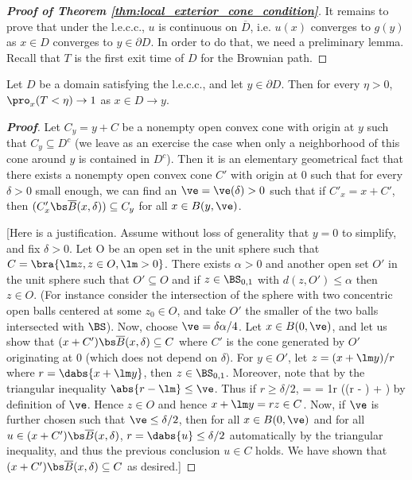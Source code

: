 \begin{proof}[\bf Proof of Theorem \ref{thm:local_exterior_cone_condition}]
It remains to prove that under the l.e.c.c., $u$ is continuous on $\overline{D}$, i.e. $u(x)$ converges to $g(y)$ as $x \in D$ converges to $y \in \partial D$. In order to do that, we need a preliminary lemma. Recall that $T$ is the first exit time of $D$ for the Brownian path.
\end{proof}

\begin{lemma}
Let $D$ be a domain satisfying the l.e.c.c., and let $y \in \partial D$. Then for every $\eta > 0$, $\pro_x(T < \eta) \to 1$ as $x \in D \to y$.
\end{lemma}
\begin{proof}[\bf Proof]
Let $C_y = y +C$ be a nonempty open convex cone with origin at $y$ such that $C_y \subseteq  D^c$ (we leave as an exercise the case when only a neighborhood of this cone around $y$ is contained in $D^c$). Then it is an elementary geometrical fact that there exists a nonempty open convex cone $C'$ with origin at 0 such that for every $\delta > 0$ small enough, we can find an $\ve = \ve(\delta) > 0$ such that if $C'_x = x + C'$, then $(C'_x \bs \overline{B}(x, \delta)) \subseteq  C_y$ for all $x \in B(y, \ve)$.

[Here is a justification. Assume without loss of generality that $y = 0$ to simplify, and fix $\delta > 0$. Let O be an open set in the unit sphere such that $C = \bra{\lm z, z \in O, \lm > 0}$. There exists $\alpha > 0$ and another open set $O'$ in the unit sphere such that $O' \subseteq O$ and if $z \in \BS_{0,1}$ with $d(z,O') \leq \alpha$ then $z \in O$. (For instance consider the intersection of the sphere with two concentric open balls centered at some $z_0 \in O$, and take $O'$ the smaller of the two balls intersected with $\BS$). Now, choose $\ve = \delta \alpha /4$. Let $x \in B(0,\ve)$, and let us show that $(x+C') \bs \overline{B}(x, \delta ) \subseteq C$ where $C'$ is the cone generated by $O'$ originating at 0 (which does not depend on $\delta$). For $y \in O'$, let $z = (x + \lm y)/r$ where $r = \dabs{x + \lm y}$, then $z \in \BS_{0,1}$. Moreover, note that by the triangular inequality $\abs{r - \lm} \leq \ve$. Thus if $r \geq \delta/2$,
\be
{} =  = \frac 1r \leq {}((r - \geq) + \ve) \leq \frac {4\ve}{\delta} \leq \alpha
\ee
by definition of $\ve$. Hence $z \in O$ and hence $x + \lm y = rz \in C$. Now, if $\ve$ is further chosen such that $\ve \leq \delta/2$, then for all $x \in B(0,\ve)$ and for all $u \in (x + C') \bs \overline{B}(x, \delta)$, $r = \dabs{u} \leq \delta/2$ automatically by the triangular inequality, and thus the previous conclusion $u \in C$ holds. We have shown that $(x + C') \bs \overline{B}(x, \delta) \subseteq C$ as desired.]


\end{proof}
